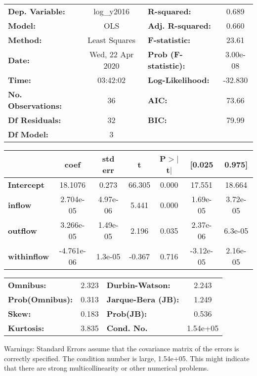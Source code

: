 \begin{center}
\begin{tabular}{lclc}
\toprule
\textbf{Dep. Variable:}    &    log\_y2016    & \textbf{  R-squared:         } &     0.689   \\
\textbf{Model:}            &       OLS        & \textbf{  Adj. R-squared:    } &     0.660   \\
\textbf{Method:}           &  Least Squares   & \textbf{  F-statistic:       } &     23.61   \\
\textbf{Date:}             & Wed, 22 Apr 2020 & \textbf{  Prob (F-statistic):} &  3.00e-08   \\
\textbf{Time:}             &     03:42:02     & \textbf{  Log-Likelihood:    } &   -32.830   \\
\textbf{No. Observations:} &          36      & \textbf{  AIC:               } &     73.66   \\
\textbf{Df Residuals:}     &          32      & \textbf{  BIC:               } &     79.99   \\
\textbf{Df Model:}         &           3      & \textbf{                     } &             \\
\bottomrule
\end{tabular}
\begin{tabular}{lcccccc}
                    & \textbf{coef} & \textbf{std err} & \textbf{t} & \textbf{P$> |$t$|$} & \textbf{[0.025} & \textbf{0.975]}  \\
\midrule
\textbf{Intercept}  &      18.1076  &        0.273     &    66.305  &         0.000        &       17.551    &       18.664     \\
\textbf{inflow}     &    2.704e-05  &     4.97e-06     &     5.441  &         0.000        &     1.69e-05    &     3.72e-05     \\
\textbf{outflow}    &    3.266e-05  &     1.49e-05     &     2.196  &         0.035        &     2.37e-06    &      6.3e-05     \\
\textbf{withinflow} &   -4.761e-06  &      1.3e-05     &    -0.367  &         0.716        &    -3.12e-05    &     2.16e-05     \\
\bottomrule
\end{tabular}
\begin{tabular}{lclc}
\textbf{Omnibus:}       &  2.323 & \textbf{  Durbin-Watson:     } &    2.243  \\
\textbf{Prob(Omnibus):} &  0.313 & \textbf{  Jarque-Bera (JB):  } &    1.249  \\
\textbf{Skew:}          &  0.183 & \textbf{  Prob(JB):          } &    0.536  \\
\textbf{Kurtosis:}      &  3.835 & \textbf{  Cond. No.          } & 1.54e+05  \\
\bottomrule
\end{tabular}
\end{center}

Warnings: \newline
 [1] Standard Errors assume that the covariance matrix of the errors is correctly specified. \newline
 [2] The condition number is large, 1.54e+05. This might indicate that there are \newline
 strong multicollinearity or other numerical problems.